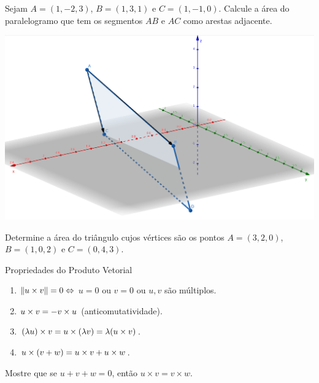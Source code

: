 \begin{frame}[label=produtovetorial]{}
	\begin{exe}
		Sejam $A=(1,-2,3)$, $B=(1,3,1)$ e $C=(1,-1,0)$. Calcule a área do paralelogramo que tem os segmentos $AB$ e $AC$ como arestas adjacente.
	\end{exe}
	
\begin{center}
\includegraphics[scale=0.3]{figuras/paralelogramo.png}
\end{center}
	
\end{frame}


\begin{frame}[label=produtovetorial]{}
\begin{casa}
Determine a área do triângulo cujos vértices são os pontos $A=(3,2,0)$, $B=(1,0,2)$ e $C=(0,4,3)$.
\end{casa}
	
\end{frame}





\begin{frame}[label=produtovetorial]{}
\begin{block}{Propriedades do Produto Vetorial}
\begin{enumerate}
	\item $\|u\times v\|=0\Leftrightarrow$ $u=0$ ou $v=0$ ou ${u}, {v}$ são múltiplos.
	\item $u\times v=-v\times u$  (anticomutatividade).
	\item $(\lambda {u})\times {v}={u}\times (\lambda{v})=\lambda(u\times v)$.
	\item ${u}\times({v}+{w})=u\times v+u\times w$.
\end{enumerate}
\end{block}
\begin{exe}
Mostre que se $u+v+w=0$, então $u\times v=v\times w$.
\end{exe}
\end{frame}

